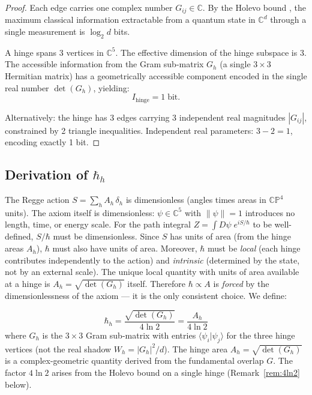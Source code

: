 \documentclass[12pt]{article}
\theoremstyle{remark}
\theoremstyle{definition}
\newcommand{\CC}{\mathbb{C}}
\begin{document}
\begin{proof}
Each edge carries one complex number $G_{ij} \in \CC$. By the Holevo bound \cite{Holevo}, the maximum classical information extractable from a quantum state in $\CC^d$ through a single measurement is $\log_2 d$ bits.

A hinge spans 3 vertices in $\CC^5$. The effective dimension of the hinge subspace is 3. The accessible information from the Gram sub-matrix $G_h$ (a single $3\times 3$ Hermitian matrix) has a geometrically accessible component encoded in the single real number $\det(G_h)$, yielding:
\begin{equation}
I_\text{hinge} = 1\;\text{bit}.
\end{equation}

Alternatively: the hinge has 3 edges carrying 3 independent real magnitudes $|G_{ij}|$, constrained by 2 triangle inequalities. Independent real parameters: $3 - 2 = 1$, encoding exactly 1 bit.
\end{proof}

\subsection{Derivation of $\hbar_h$}

The Regge action $S = \sum_h A_h\,\delta_h$ is dimensionless (angles times areas in $\mathbb{CP}^4$ units). The axiom itself is dimensionless: $\psi \in \CC^5$ with $\|\psi\| = 1$ introduces no length, time, or energy scale. For the path integral $Z = \int D\psi\; e^{iS/\hbar}$ to be well-defined, $S/\hbar$ must be dimensionless. Since $S$ has units of area (from the hinge areas $A_h$), $\hbar$ must also have units of area. Moreover, $\hbar$ must be \emph{local} (each hinge contributes independently to the action) and \emph{intrinsic} (determined by the state, not by an external scale). The unique local quantity with units of area available at a hinge is $A_h = \sqrt{\det(G_h)}$ itself. Therefore $\hbar \propto A$ is \emph{forced} by the dimensionlessness of the axiom --- it is the only consistent choice. We define:

\begin{equation}
\boxed{\hbar_h = \frac{\sqrt{\det(G_h)}}{4\ln 2} = \frac{A_h}{4\ln 2}}
\label{eq:hbar}
\end{equation}
where $G_h$ is the $3 \times 3$ Gram sub-matrix with entries $\langle\psi_i|\psi_j\rangle$ for the three hinge vertices (not the real shadow $W_h = |G_h|^2/d$). The hinge area $A_h = \sqrt{\det(G_h)}$ is a complex-geometric quantity derived from the fundamental overlap $G$. The factor $4\ln 2$ arises from the Holevo bound on a single hinge (Remark~\ref{rem:4ln2} below).
\end{document}
